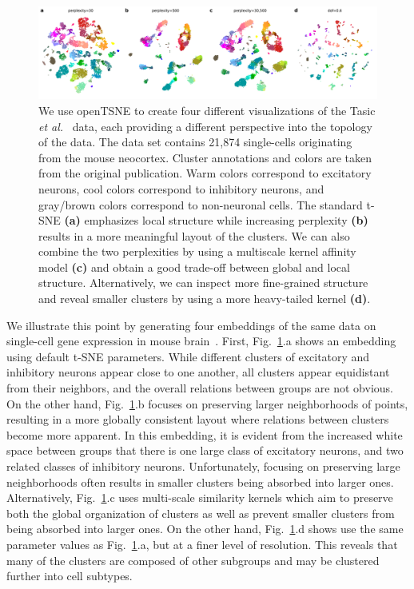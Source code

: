 \documentclass[twocolumn]{bmcart}
\begin{document}
\begin{figure}[htbp]
	\includegraphics[width=\textwidth]{tasic2018}
	\caption{\label{fig:tasic}We use openTSNE to create four different
    visualizations of the Tasic \textit{et al.}~\cite{tasic2018shared} data,
    each providing a different perspective into the topology of the data.
    The data set contains 21,874 single-cells originating from the mouse
	neocortex. Cluster annotations and colors are taken from the original
	publication. Warm colors correspond to excitatory neurons, cool colors
	correspond to inhibitory neurons, and gray/brown colors correspond to
	non-neuronal cells. The standard t-SNE \textbf{(a)} emphasizes local
	structure while increasing perplexity \textbf{(b)} results in a more
	meaningful layout of the clusters. We can also combine the two
	perplexities by using a multiscale kernel affinity model \textbf{(c)}
	and obtain a good trade-off between global and local structure.
	Alternatively, we can inspect more fine-grained structure and reveal
	smaller clusters by using a more heavy-tailed kernel \textbf{(d)}.}
\end{figure}

We illustrate this point by generating four embeddings of the same data on
single-cell gene expression in mouse brain~\cite{tasic2018shared}.  First,
Fig.~\ref{fig:tasic}.a shows an embedding using default t-SNE parameters. While
different clusters of excitatory and inhibitory neurons appear close to one
another, all clusters appear equidistant from their neighbors, and the overall
relations between groups are not obvious. On the other hand,
Fig.~\ref{fig:tasic}.b focuses on preserving larger neighborhoods of points,
resulting in a more globally consistent layout where relations between clusters
become more apparent. In this embedding, it is evident from the increased
white space between groups that there is one large class of excitatory neurons,
and two related classes of inhibitory neurons. Unfortunately, focusing on
preserving large neighborhoods often results in smaller clusters being absorbed
into larger ones. Alternatively, Fig.~\ref{fig:tasic}.c uses multi-scale
similarity kernels which aim to preserve both the global organization of
clusters as well as prevent smaller clusters from being absorbed into larger
ones. On the other hand, Fig.~\ref{fig:tasic}.d shows use the same parameter
values as Fig.~\ref{fig:tasic}.a, but at a finer level of resolution. This
reveals that many of the clusters are composed of other subgroups and may be
clustered further into cell subtypes.
\end{document}
